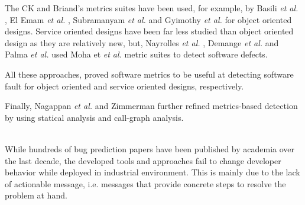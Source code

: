\cite{Briand1999a}

The CK and Briand's metrics suites have been used, for example, by Basili \textit{et al.} \cite{Basili1996}, El Emam \textit{et al.} \cite{ElEmam2001},  Subramanyam \textit{et al.} \cite{Subramanyam2003} and Gyimothy \textit{et al.} \cite{Gyimothy2005} for object oriented designs.
Service oriented designs have been far less studied than object oriented design as they are relatively new, but, Nayrolles \textit{et al.} \cite{Nayrolles,Nayrolles2013d}, Demange \textit{et al.} \cite{demange2013} and Palma \textit{et al.} \cite{Palma2013} used Moha et \textit{et al.} metric suites to detect software defects.

All these approaches, proved software metrics to be useful at detecting software fault for object oriented and service oriented designs, respectively.

Finally, Nagappan \textit{et al.} \cite{Nagappan2005,Nagappan2006} and Zimmerman \cite{Zimmermann2007,Zimmermann2008} further refined metrics-based detection by using statical analysis and call-graph analysis.

\\ 
While hundreds of bug prediction papers have been published by academia over the last decade, the developed tools and approaches fail to change developer behavior while deployed in industrial environment\cite{Lewis2013}.
This is mainly due to the lack of actionable message, i.e. messages that provide concrete steps to resolve the problem at hand.
